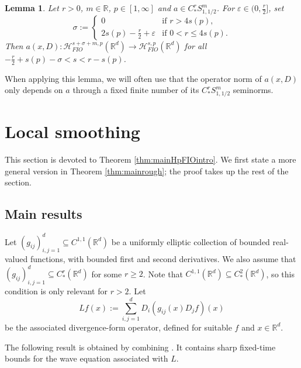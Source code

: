 \documentclass{amsart}
\numberwithin{equation}{section}
\newtheorem{lemma}[theorem]{Lemma}
\theoremstyle{definition}
\newcommand{\R}{\mathbb{R}}
\newcommand{\Rd}{\mathbb{R}^{d}}
\newcommand{\Rn}{\mathbb{R}^{d}}
\newcommand {\HT}{\mathcal{H}}
\newcommand {\Hps}{\mathcal{H}^{s,p}_{FIO}(\R^d)}
\newcommand {\veps}{\varepsilon}
\begin{document}
\begin{lemma}\label{lem:pseudoHpFIO}
Let $r>0$, $m\in\R$, $p\in[1,\infty]$ and $a\in C^{r}_{*}S^{m}_{1,1/2}$. For $\veps\in(0,\frac{r}{2}]$, set
\[
\sigma:=\begin{cases}
0&\text{if }r>4s(p),\\
2s(p)-\frac{r}{2}+\veps&\text{if }0<r\leq 4s(p).
\end{cases}
\]
Then $a(x,D):\HT^{s+\sigma+m,p}_{FIO}(\Rn)\to \Hps$ for all $-\tfrac{r}{2}+s(p)-\sigma<s<r-s(p)$. 
\end{lemma}

When applying this lemma, we will often use that the operator norm of $a(x,D)$  only depends on $a$ through a fixed finite number of its $C^{r}_{*}S^{m}_{1,1/2}$ seminorms.

\section{Local smoothing}\label{sec:BilinearSmoothing}

This section is devoted to Theorem \ref{thm:mainHpFIOintro}. We first state a more general version in Theorem \ref{thm:mainrough}; the proof takes up the rest of the section. 

\subsection{Main results}\label{subsec:main}

Let $(g_{ij})_{i,j=1}^{d}\subseteq C^{1,1}(\R^d)$ be a uniformly elliptic collection of bounded real-valued functions, with bounded first and second derivatives. We also assume that $(g_{ij})_{i,j=1}^{d}\subseteq C^{r}_{*}(\R^d)$ for some $r\geq 2$. Note that $C^{1,1}(\R^d)\subseteq C^{2}_{*}(\R^d)$, so this condition is only relevant for $r>2$. Let
\begin{equation}\label{eq:defL}
Lf(x):=\sum_{i,j=1}^{d}D_{i}(g_{ij}(x)D_{j}f)(x)
\end{equation}
be the associated divergence-form operator, defined for suitable $f$ and $x\in\Rd$. 

The following result is obtained by combining \cite[Theorem 4.7 and Corollary 4.13]{LiRoSo25a}. It contains sharp fixed-time bounds for the wave equation associated with $L$.
\end{document}
